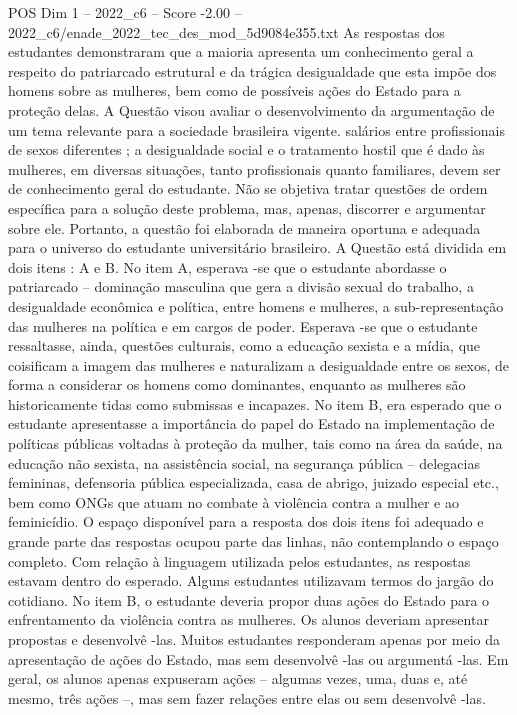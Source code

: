 \begin{textsample}{POS Dim 1 – 2022\_c6 – Score -2.00 – 2022\_c6/enade\_2022\_tec\_des\_mod\_5d9084e355.txt}
As respostas dos estudantes demonstraram que a maioria apresenta um conhecimento geral a respeito do patriarcado estrutural e da trágica desigualdade que esta impõe dos homens sobre as mulheres, bem como de possíveis ações do Estado para a proteção delas.
A Questão visou avaliar o desenvolvimento da argumentação de um tema relevante para a sociedade brasileira vigente. salários entre profissionais de sexos diferentes ; a desigualdade social e o tratamento hostil que é dado às mulheres, em diversas situações, tanto profissionais quanto familiares, devem ser de conhecimento geral do estudante.
Não se objetiva tratar questões de ordem específica para a solução deste problema, mas, apenas, discorrer e argumentar sobre ele.
Portanto, a questão foi elaborada de maneira oportuna e adequada para o universo do estudante universitário brasileiro.
A Questão está dividida em dois itens : A e B.
No item A, esperava -se que o estudante abordasse o patriarcado – dominação masculina que gera a divisão sexual do trabalho, a desigualdade econômica e política, entre homens e mulheres, a sub-representação das mulheres na política e em cargos de poder.
Esperava -se que o estudante ressaltasse, ainda, questões culturais, como a educação sexista e a mídia, que coisificam a imagem das mulheres e naturalizam a desigualdade entre os sexos, de forma a considerar os homens como dominantes, enquanto as mulheres são historicamente tidas como submissas e incapazes.
No item B, era esperado que o estudante apresentasse a importância do papel do Estado na implementação de políticas públicas voltadas à proteção da mulher, tais como na área da saúde, na educação não sexista, na assistência social, na segurança pública – delegacias femininas, defensoria pública especializada, casa de abrigo, juizado especial etc., bem como ONGs que atuam no combate à violência contra a mulher e ao feminicídio.
O espaço disponível para a resposta dos dois itens foi adequado e grande parte das respostas ocupou parte das linhas, não contemplando o espaço completo.
Com relação à linguagem utilizada pelos estudantes, as respostas estavam dentro do esperado.
Alguns estudantes utilizavam termos do jargão do cotidiano.
No item B, o estudante deveria propor duas ações do Estado para o enfrentamento da violência contra as mulheres.
Os alunos deveriam apresentar propostas e desenvolvê -las.
Muitos estudantes responderam apenas por meio da apresentação de ações do Estado, mas sem desenvolvê -las ou argumentá -las.
Em geral, os alunos apenas expuseram ações – algumas vezes, uma, duas e, até mesmo, três ações –, mas sem fazer relações entre elas ou sem desenvolvê -las.

\end{textsample}

